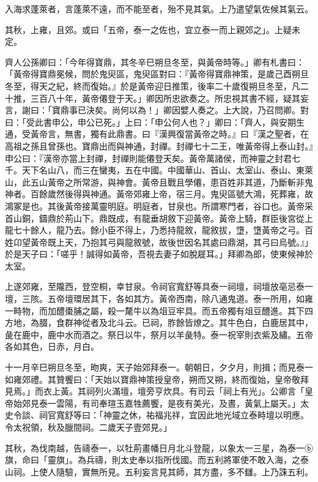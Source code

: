 \begin{pinyinscope}
入海求蓬萊者，言蓬萊不遠，而不能至者，殆不見其氣。上乃遣望氣佐候其氣云。

其秋，上雍，且郊。或曰「五帝，泰一之佐也，宜立泰一而上親郊之」。上疑未定。

齊人公孫卿曰：「今年得寶鼎，其冬辛巳朔旦冬至，與黃帝時等。」卿有札書曰：「黃帝得寶鼎冕候，問於鬼臾區，鬼臾區對曰：『黃帝得寶鼎神策，是歲己酉朔旦冬至，得天之紀，終而復始。』於是黃帝迎日推策，後率二十歲復朔旦冬至，凡二十推，三百八十年，黃帝僊登于天。」卿因所忠欲奏之。所忠視其書不經，疑其妄言，謝曰：「寶鼎事已決矣。尚何以為！」卿因嬖人奏之。上大說，乃召問卿。對曰：「受此書申公，申公已死。」上曰：「申公何人也？」卿曰：「齊人，與安期生通，受黃帝言，無書，獨有此鼎書。曰『漢興復當黃帝之時。』曰『漢之聖者，在高祖之孫且曾孫也。寶鼎出而與神通，封禪。封禪七十二王，唯黃帝得上泰山封。』申公曰：『漢帝亦當上封禪，封禪則能僊登天矣。黃帝萬諸侯，而神靈之封君七千。天下名山八，而三在蠻夷，五在中國。中國華山、首山、太室山、泰山、東萊山，此五山黃帝之所常游，與神會。黃帝且戰且學僊，患百姓非其道，乃斷斬非鬼神者。百餘歲然後得與神通。黃帝郊雍上帝，宿三月。鬼臾區號大鴻，死葬雍，故鴻冢是也。其後黃帝接萬靈明庭。明庭者，甘泉也。所謂寒門者，谷口也。黃帝采首山銅，鑄鼎於荊山下。鼎既成，有龍垂胡敘下迎黃帝。黃帝上騎，群臣後宮從上龍七十餘人，龍乃去。餘小臣不得上，乃悉持龍敘，龍敘拔，墯，墯黃帝之弓。百姓卬望黃帝既上天，乃抱其弓與龍敘號，故後世因名其處曰鼎湖，其弓曰烏號。』」於是天子曰：「嗟乎！誠得如黃帝，吾視去妻子如脫屣耳。」拜卿為郎，使東候神於太室。

上遂郊雍，至隴西，登空桐，幸甘泉。令祠官寬舒等具泰一祠壇，祠壇放亳忌泰一壇，三陔。五帝壇環居其下，各如其方。黃帝西南，除八通鬼道。泰一所用，如雍一畤物，而加醴棗脯之屬，殺一氂牛以為俎豆牢具。而五帝獨有俎豆醴進。其下四方地，為腏，食群神從者及北斗云。已祠，胙餘皆燎之。其牛色白，白鹿居其中，彘在鹿中，鹿中水而酒之。祭日以牛，祭月以羊彘特。泰一祝宰則衣紫及繡。五帝各如其色，日赤，月白。

十一月辛巳朔旦冬至，昒爽，天子始郊拜泰一。朝朝日，夕夕月，則揖；而見泰一如雍郊禮。其贊饗曰：「天始以寶鼎神策授皇帝，朔而又朔，終而復始，皇帝敬拜見焉。」而衣上黃。其祠列火滿壇，壇旁亨炊具。有司云「祠上有光」。公卿言「皇帝始郊見泰一雲陽，有司奉瑄玉嘉牲薦饗，是夜有美光，及晝，黃氣上屬天。」太史令談、祠官寬舒等曰：「神靈之休，祐福兆祥，宜因此地光域立泰畤壇以明應。令太祝領，秋及臘間祠。二歲天子壹郊見。」

其秋，為伐南越，告禱泰一，以牡荊畫幡日月北斗登龍，以象太一三星，為泰一ⓑ旗，命曰「靈旗」。為兵禱，則太史奉以指所伐國。而五利將軍使不敢入海，之泰山祠。上使人隨驗，實無所見。五利妄言見其師，其方盡，多不讎。上乃誅五利。


\end{pinyinscope}
